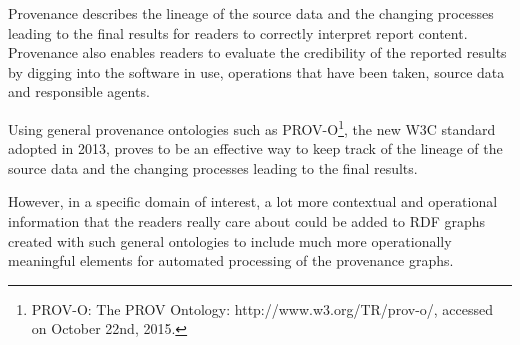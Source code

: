 Provenance describes the lineage of the source data and the changing processes leading to the final results for readers to correctly interpret report content. Provenance also enables readers to evaluate the credibility of the reported results by digging into the software in use, operations that have been taken, source data and responsible agents.

Using general provenance ontologies such as PROV-O\footnote{PROV-O: The PROV Ontology: http://www.w3.org/TR/prov-o/, accessed on October 22nd, 2015.}, the new W3C standard adopted in 2013, proves to be an effective way to keep track of the lineage of the source data and the changing processes leading to the final results.

However, in a specific domain of interest, a lot more contextual and operational information that the readers really care about could be added to RDF graphs created with such general ontologies to include much more operationally meaningful elements for automated processing of the provenance graphs.

